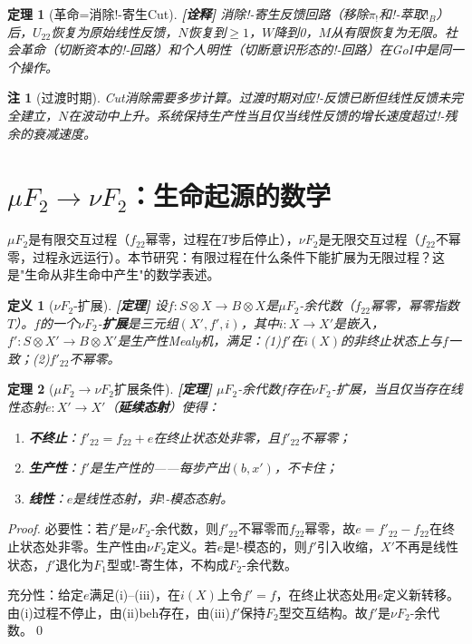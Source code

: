 \documentclass[11pt,a4paper]{article}
\newtheorem{definition}{定义}
\newtheorem{theorem}{定理}
\newtheorem{remark}{注}
\newcommand{\lvl}[1]{\hfill\textbf{\footnotesize[#1]}}
\newcommand{\lvP}{\lvl{定理}}
\newcommand{\lvI}{\lvl{诠释}}
\newcommand{\bang}{{!}}
\newcommand{\tensor}{\otimes}
\begin{document}
\begin{theorem}[革命=消除!-寄生Cut]\label{thm:revolution-cut}\lvI
消除!-寄生反馈回路（移除$\pi_!$和!-萃取$!_B$）后，$U_{22}$恢复为原始线性反馈，$N$恢复到$\geq1$，$W$降到0，$M$从有限恢复为无限。社会革命（切断资本的!-回路）和个人明性（切断意识形态的!-回路）在GoI中是同一个操作。
\end{theorem}

\begin{remark}[过渡时期]
Cut消除需要多步计算。过渡时期对应!-反馈已断但线性反馈未完全建立，$N$在波动中上升。系统保持生产性当且仅当线性反馈的增长速度超过!-残余的衰减速度。
\end{remark}


\section{$\mu F_2\to\nu F_2$：生命起源的数学}

$\mu F_2$是有限交互过程（$f_{22}$幂零，过程在$T$步后停止），$\nu F_2$是无限交互过程（$f_{22}$不幂零，过程永远运行）。本节研究：有限过程在什么条件下能扩展为无限过程？这是"生命从非生命中产生"的数学表述。

\begin{definition}[$\nu F_2$-扩展]\label{def:nu-extension}\lvP
设$f:S\tensor X\to B\tensor X$是$\mu F_2$-余代数（$f_{22}$幂零，幂零指数$T$）。$f$的一个$\nu F_2$-\textbf{扩展}是三元组$(X',f',i)$，其中$i:X\to X'$是嵌入，$f':S\tensor X'\to B\tensor X'$是生产性Mealy机，满足：(1)$f'$在$i(X)$的非终止状态上与$f$一致；(2)$f'_{22}$不幂零。
\end{definition}

\begin{theorem}[$\mu F_2\to\nu F_2$扩展条件]\label{thm:mu-to-nu}\lvP
$\mu F_2$-余代数$f$存在$\nu F_2$-扩展，当且仅当存在线性态射$e:X'\to X'$（\textbf{延续态射}）使得：
\begin{enumerate}
  \item \textbf{不终止}：$f'_{22}=f_{22}+e$在终止状态处非零，且$f'_{22}$不幂零；
  \item \textbf{生产性}：$f'$是生产性的——每步产出$(b,x')$，不卡住；
  \item \textbf{线性}：$e$是线性态射，非$\bang$-模态态射。
\end{enumerate}
\end{theorem}

\begin{proof}
必要性：若$f'$是$\nu F_2$-余代数，则$f'_{22}$不幂零而$f_{22}$幂零，故$e=f'_{22}-f_{22}$在终止状态处非零。生产性由$\nu F_2$定义。若$e$是$\bang$-模态的，则$f'$引入收缩，$X'$不再是线性状态，$f'$退化为$F_1$型或$\bang$-寄生体，不构成$F_2$-余代数。

充分性：给定$e$满足(i)--(iii)，在$i(X)$上令$f'=f$，在终止状态处用$e$定义新转移。由(i)过程不停止，由(ii)$\mathrm{beh}$存在，由(iii)$f'$保持$F_2$型交互结构。故$f'$是$\nu F_2$-余代数。\qed
\end{proof}
\end{document}
